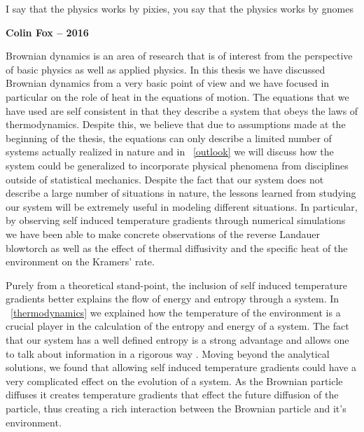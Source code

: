 \epigraph{I say that the physics works by pixies, you say that the physics works by gnomes}{\textbf{Colin Fox -- 2016}}

Brownian dynamics is an area of research that is of interest from the perspective of basic physics as well as applied physics. In this thesis we have discussed Brownian dynamics from a very basic point of view and we have focused in particular on the role of heat in the equations of motion. The equations that we have used are self consistent in that they describe a system that obeys the laws of thermodynamics. Despite this, we believe that due to assumptions made at the beginning of the thesis, the equations can only describe a limited number of systems actually realized in nature and in ~\autoref{outlook} we will discuss how the system could be generalized to incorporate physical phenomena from disciplines outside of statistical mechanics. Despite the fact that our system does not describe a large number of situations in nature, the lessons learned from studying our system will be extremely useful in modeling different situations. In particular, by observing self induced temperature gradients through numerical simulations we have been able to make concrete observations of the reverse Landauer blowtorch as well as the effect of thermal diffusivity and the specific heat of the environment on the Kramers' rate.  

Purely from a theoretical stand-point, the inclusion of self induced temperature gradients better explains the flow of energy and entropy through a system. In ~\autoref{thermodynamics} we explained how the temperature of the environment is a crucial player in the calculation of the entropy and energy of a system. The fact that our system has a well defined entropy is a strong advantage and allows one to talk about information in a rigorous way \cite{Landauer1961,MyersCelebranoKrishnan2015}. Moving beyond the analytical solutions, we found that allowing self induced temperature gradients could have a very complicated effect on the evolution of a system. As the Brownian particle diffuses it creates temperature gradients that effect the future diffusion of the particle, thus creating a rich interaction between the Brownian particle and it's environment.

